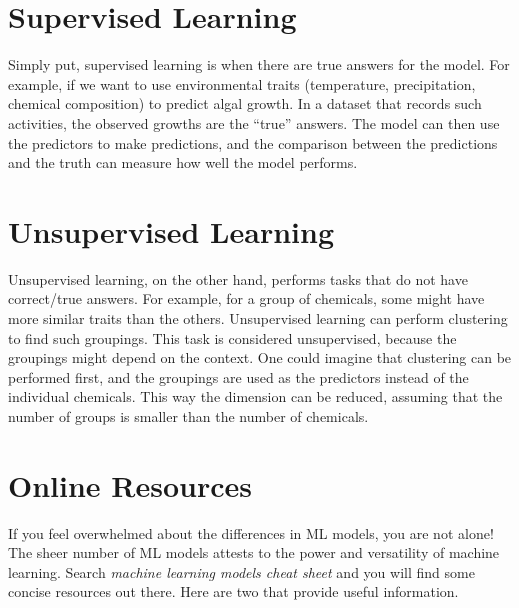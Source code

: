 \documentclass[
]{book}
\begin{document}
\hypertarget{supervised-learning}{%
\section{Supervised Learning}\label{supervised-learning}}

Simply put, supervised learning is when there are true answers for the model. For example, if we want to use environmental traits (temperature, precipitation, chemical composition) to predict algal growth. In a dataset that records such activities, the observed growths are the ``true'' answers. The model can then use the predictors to make predictions, and the comparison between the predictions and the truth can measure how well the model performs.

\hypertarget{unsupervised-learning}{%
\section{Unsupervised Learning}\label{unsupervised-learning}}

Unsupervised learning, on the other hand, performs tasks that do not have correct/true answers. For example, for a group of chemicals, some might have more similar traits than the others. Unsupervised learning can perform clustering to find such groupings. This task is considered unsupervised, because the groupings might depend on the context. One could imagine that clustering can be performed first, and the groupings are used as the predictors instead of the individual chemicals. This way the dimension can be reduced, assuming that the number of groups is smaller than the number of chemicals.

\hypertarget{online-resources}{%
\section{Online Resources}\label{online-resources}}

If you feel overwhelmed about the differences in ML models, you are not alone! The sheer number of ML models attests to the power and versatility of machine learning. Search \emph{machine learning models cheat sheet} and you will find some concise resources out there. Here are two that provide useful information.
\end{document}

